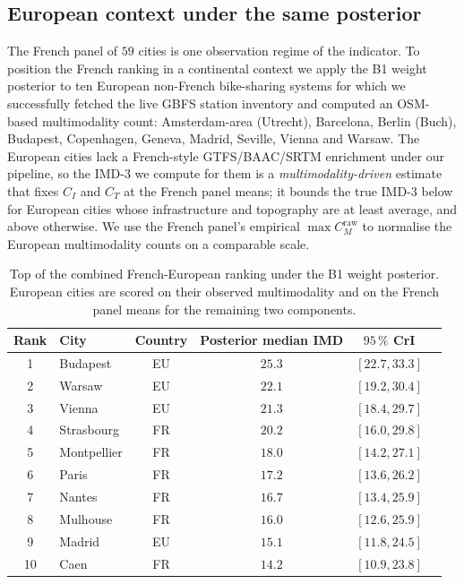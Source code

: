 \documentclass[11pt,a4paper]{article}
\begin{document}
\subsection{European context under the same posterior}
\label{sec:application-eu}

The French panel of $59$ cities is one observation regime of the
indicator. To position the French ranking in a continental
context we apply the B1 weight posterior to ten European
non-French bike-sharing systems for which we successfully fetched
the live GBFS station inventory and computed an OSM-based
multimodality count: Amsterdam-area (Utrecht), Barcelona,
Berlin (Buch), Budapest, Copenhagen, Geneva, Madrid, Seville,
Vienna and Warsaw. The European cities lack a French-style
GTFS/BAAC/SRTM enrichment under our pipeline, so the IMD-3 we
compute for them is a \emph{multimodality-driven} estimate that
fixes $C_I$ and $C_T$ at the French panel means; it bounds the
true IMD-3 below for European cities whose infrastructure and
topography are at least average, and above otherwise. We use the
French panel's empirical $\max C_M^{\text{raw}}$ to normalise the
European multimodality counts on a comparable scale.

\begin{table}[H]
\centering
\caption{Top of the combined French-European ranking under the
B1 weight posterior. European cities are scored on their
observed multimodality and on the French panel means for the
remaining two components.}
\label{tab:eu-ranking}
\small
\begin{tabular}{@{}clcccc@{}}
\toprule
Rank & City & Country & Posterior median IMD &
$95\,\%$ CrI \\
\midrule
1  & Budapest      & EU & $25.3$ & $[22.7, 33.3]$ \\
2  & Warsaw        & EU & $22.1$ & $[19.2, 30.4]$ \\
3  & Vienna        & EU & $21.3$ & $[18.4, 29.7]$ \\
4  & Strasbourg    & FR & $20.2$ & $[16.0, 29.8]$ \\
5  & Montpellier   & FR & $18.0$ & $[14.2, 27.1]$ \\
6  & Paris         & FR & $17.2$ & $[13.6, 26.2]$ \\
7  & Nantes        & FR & $16.7$ & $[13.4, 25.9]$ \\
8  & Mulhouse      & FR & $16.0$ & $[12.6, 25.9]$ \\
9  & Madrid        & EU & $15.1$ & $[11.8, 24.5]$ \\
10 & Caen          & FR & $14.2$ & $[10.9, 23.8]$ \\
\bottomrule
\end{tabular}
\end{table}
\end{document}
